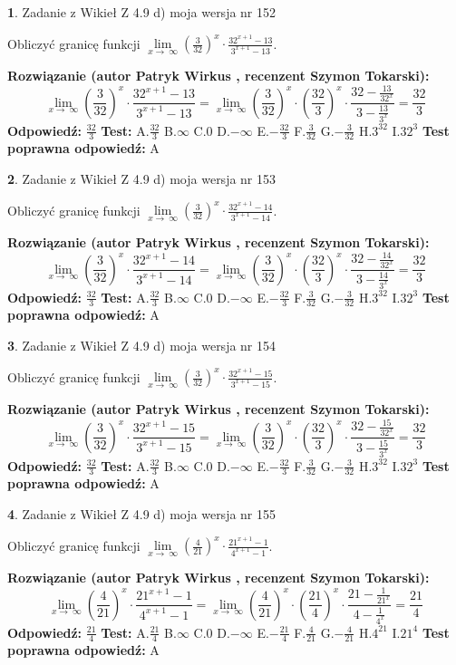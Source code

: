 \documentclass[12pt, a4paper]{article}
\theoremstyle{definition} %
\newtheorem{zad}{}
\newcommand{\zadStart}[1]{\begin{zad}#1\newline}
\newcommand{\zadStop}{\end{zad}}
\newcommand{\rozwStart}[2]{\noindent \textbf{Rozwiązanie (autor #1 , recenzent #2): }\newline}
\newcommand{\rozwStop}{\newline}
\newcommand{\odpStart}{\noindent \textbf{Odpowiedź:}\newline}
\newcommand{\odpStop}{\newline}
\newcommand{\testStart}{\noindent \textbf{Test:}\newline}
\newcommand{\testStop}{\newline}
\newcommand{\kluczStart}{\noindent \textbf{Test poprawna odpowiedź:}\newline}
\newcommand{\kluczStop}{\newline}
\begin{document}
\zadStart{Zadanie z Wikieł Z 4.9 d) moja wersja nr 152}


Obliczyć granicę funkcji  $\lim\limits_{x\to\ \infty}(\frac{3}{32})^{x}\cdot\frac{32^{x+1}-13}{3^{x+1}-13}$.
\zadStop
\rozwStart{Patryk Wirkus}{Szymon Tokarski}
$$\lim\limits_{x\to\ \infty}(\frac{3}{32})^{x}\cdot\frac{32^{x+1}-13}{3^{x+1}-13}=\lim\limits_{x\to\ \infty}(\frac{3}{32})^{x}\cdot(\frac{32}{3})^{x} \cdot \frac{32-\frac{13}{32^{x}}}{3-\frac{13}{3^{x}}} = \frac{32}{3}$$
\rozwStop
\odpStart
$\frac{32}{3}$
\odpStop
\testStart
A.$\frac{32}{3}$ B.$\infty$ C.$0$ D.$-\infty$ E.$-\frac{32}{3}$
F.$\frac{3}{32}$ G.$-\frac{3}{32}$
H.$3^{32}$
I.$32^{3}$
\testStop
\kluczStart
A
\kluczStop



\zadStart{Zadanie z Wikieł Z 4.9 d) moja wersja nr 153}


Obliczyć granicę funkcji  $\lim\limits_{x\to\ \infty}(\frac{3}{32})^{x}\cdot\frac{32^{x+1}-14}{3^{x+1}-14}$.
\zadStop
\rozwStart{Patryk Wirkus}{Szymon Tokarski}
$$\lim\limits_{x\to\ \infty}(\frac{3}{32})^{x}\cdot\frac{32^{x+1}-14}{3^{x+1}-14}=\lim\limits_{x\to\ \infty}(\frac{3}{32})^{x}\cdot(\frac{32}{3})^{x} \cdot \frac{32-\frac{14}{32^{x}}}{3-\frac{14}{3^{x}}} = \frac{32}{3}$$
\rozwStop
\odpStart
$\frac{32}{3}$
\odpStop
\testStart
A.$\frac{32}{3}$ B.$\infty$ C.$0$ D.$-\infty$ E.$-\frac{32}{3}$
F.$\frac{3}{32}$ G.$-\frac{3}{32}$
H.$3^{32}$
I.$32^{3}$
\testStop
\kluczStart
A
\kluczStop



\zadStart{Zadanie z Wikieł Z 4.9 d) moja wersja nr 154}


Obliczyć granicę funkcji  $\lim\limits_{x\to\ \infty}(\frac{3}{32})^{x}\cdot\frac{32^{x+1}-15}{3^{x+1}-15}$.
\zadStop
\rozwStart{Patryk Wirkus}{Szymon Tokarski}
$$\lim\limits_{x\to\ \infty}(\frac{3}{32})^{x}\cdot\frac{32^{x+1}-15}{3^{x+1}-15}=\lim\limits_{x\to\ \infty}(\frac{3}{32})^{x}\cdot(\frac{32}{3})^{x} \cdot \frac{32-\frac{15}{32^{x}}}{3-\frac{15}{3^{x}}} = \frac{32}{3}$$
\rozwStop
\odpStart
$\frac{32}{3}$
\odpStop
\testStart
A.$\frac{32}{3}$ B.$\infty$ C.$0$ D.$-\infty$ E.$-\frac{32}{3}$
F.$\frac{3}{32}$ G.$-\frac{3}{32}$
H.$3^{32}$
I.$32^{3}$
\testStop
\kluczStart
A
\kluczStop



\zadStart{Zadanie z Wikieł Z 4.9 d) moja wersja nr 155}


Obliczyć granicę funkcji  $\lim\limits_{x\to\ \infty}(\frac{4}{21})^{x}\cdot\frac{21^{x+1}-1}{4^{x+1}-1}$.
\zadStop
\rozwStart{Patryk Wirkus}{Szymon Tokarski}
$$\lim\limits_{x\to\ \infty}(\frac{4}{21})^{x}\cdot\frac{21^{x+1}-1}{4^{x+1}-1}=\lim\limits_{x\to\ \infty}(\frac{4}{21})^{x}\cdot(\frac{21}{4})^{x} \cdot \frac{21-\frac{1}{21^{x}}}{4-\frac{1}{4^{x}}} = \frac{21}{4}$$
\rozwStop
\odpStart
$\frac{21}{4}$
\odpStop
\testStart
A.$\frac{21}{4}$ B.$\infty$ C.$0$ D.$-\infty$ E.$-\frac{21}{4}$
F.$\frac{4}{21}$ G.$-\frac{4}{21}$
H.$4^{21}$
I.$21^{4}$
\testStop
\kluczStart
A
\kluczStop
\end{document}
